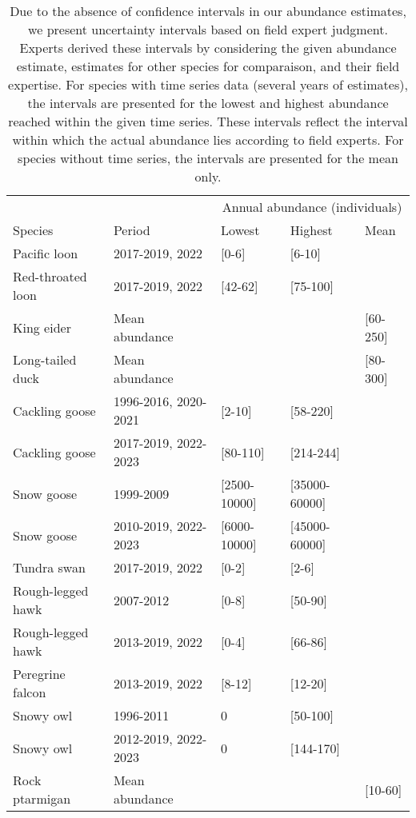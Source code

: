 \begin{table}[ht]
\centering
\caption{Due to the absence of confidence intervals in our abundance estimates, we present uncertainty intervals based on field expert judgment. Experts derived these intervals by considering the given abundance estimate, estimates for other species for comparaison, and their field expertise. For species with time series data (several years of estimates), the intervals are presented for the lowest and highest abundance reached within the given time series. These intervals reflect the interval within which the actual abundance lies according to field experts.  For species without time series, the intervals are presented for the mean only.} 
\begingroup\fontsize{10pt}{8pt}\selectfont
\begin{tabularx}{\textwidth}{lllll}
  \hline
  & &\multicolumn{3}{c}{Annual abundance (individuals)} \\
 Species & Period & Lowest & Highest & Mean \\
 \hline
Pacific loon & 2017-2019, 2022 & [0-6] & [6-10] &  \\ 
  Red-throated loon & 2017-2019, 2022 & [42-62] & [75-100] &  \\ 
  King eider & Mean abundance &  &  & [60-250] \\ 
  Long-tailed duck & Mean abundance &  &  & [80-300] \\ 
  Cackling goose & 1996-2016, 2020-2021 & [2-10] & [58-220] &  \\ 
  Cackling goose & 2017-2019, 2022-2023 & [80-110] & [214-244] &  \\ 
  Snow goose & 1999-2009 & [2500-10000] & [35000-60000] &  \\ 
  Snow goose & 2010-2019, 2022-2023 & [6000-10000] & [45000-60000] &  \\ 
  Tundra swan & 2017-2019, 2022 & [0-2] & [2-6] &  \\ 
  Rough-legged hawk & 2007-2012 & [0-8] & [50-90] &  \\ 
  Rough-legged hawk & 2013-2019, 2022 & [0-4] & [66-86] &  \\ 
  Peregrine falcon & 2013-2019, 2022 & [8-12] & [12-20] &  \\ 
  Snowy owl & 1996-2011 & 0 & [50-100] &  \\ 
  Snowy owl & 2012-2019, 2022-2023 & 0 & [144-170] &  \\ 
  Rock ptarmigan & Mean abundance &  &  & [10-60] \\ 

\end{tabularx}
\end{table}

